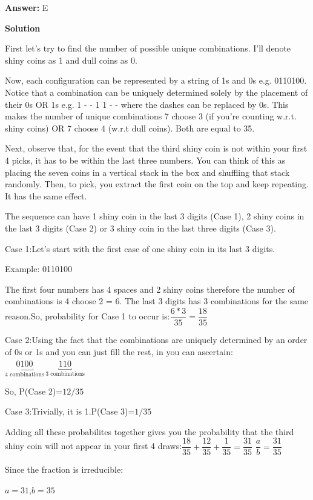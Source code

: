 \begin{enumerate}
 \textbf{Answer: }E



\textbf{Solution}

First let’s try to find the number of possible unique combinations. I’ll denote shiny coins as 1 and dull coins as 0. 

 Now, each configuration can be represented by a string of 1s and 0s e.g. 0110100. Notice that a combination can be uniquely determined solely by the placement of their 0s OR 1s e.g. 1 - - 1 1 - - where the dashes can be replaced by 0s. This makes the number of unique combinations 7 choose 3 (if you’re counting w.r.t. shiny coins) OR 7 choose 4 (w.r.t dull coins). Both are equal to 35.

 Next, observe that, for the event that the third shiny coin is not within your first 4 picks, it has to be within the last three numbers. You can think of this as placing the seven coins in a vertical stack in the box and shuffling that stack randomly. Then, to pick, you extract the first coin on the top and keep repeating. It has the same effect.

 The sequence can have 1 shiny coin in the last 3 digits (Case 1), 2 shiny coins in the last 3 digits (Case 2) or 3 shiny coin in the last three digits (Case 3).

 Case 1:Let’s start with the first case of one shiny coin in its last 3 digits.

 Example: 0110100

 The first four numbers has 4 spaces and 2 shiny coins therefore the number of combinations is 4 choose 2 = 6. The last 3 digits has 3 combinations for the same reason.So, probability for Case 1 to occur is:$\dfrac{6*3}{35}=\dfrac{18}{35}$

 Case 2:Using the fact that the combinations are uniquely determined by an order of 0s or 1s and you can just fill the rest, in you can ascertain:$\underbracket{0100}_{\text{4 combinations}}\, \underbracket{110}_{\text{3 combinations}}$

 So, P(Case 2)=$12/35$

 Case 3:Trivially, it is 1.P(Case 3)=$1/35$

 Adding all these probabilites together gives you the probability that the third shiny coin will not appear in your first 4 draws:$\dfrac{18}{35}+\dfrac{12}{35}+\dfrac{1}{35}=\dfrac{31}{35}$
$\dfrac{a}{b}=\dfrac{31}{35}$

 Since the fraction is irreducible:

 $a=31$,$b=35$


\end{enumerate}
